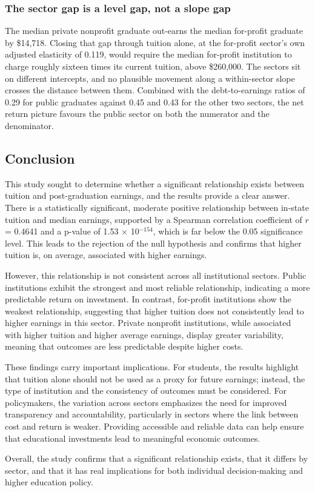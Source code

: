 \subsubsection*{The sector gap is a level gap, not a slope gap}

The median private nonprofit graduate out-earns the median for-profit graduate by \$14,718. Closing that gap through tuition alone, at the for-profit sector's own adjusted elasticity of 0.119, would require the median for-profit institution to charge roughly sixteen times its current tuition, above \$260,000. The sectors sit on different intercepts, and no plausible movement along a within-sector slope crosses the distance between them. Combined with the debt-to-earnings ratios of 0.29 for public graduates against 0.45 and 0.43 for the other two sectors, the net return picture favours the public sector on both the numerator and the denominator.

\subsection{Conclusion}

This study sought to determine whether a significant relationship exists between tuition and post-graduation earnings, and the results provide a clear answer. There is a statistically significant, moderate positive relationship between in-state tuition and median earnings, supported by a Spearman correlation coefficient of $r$ = 0.4641 and a p-value of 1.53 $\times$ 10$^{-154}$, which is far below the 0.05 significance level. This leads to the rejection of the null hypothesis and confirms that higher tuition is, on average, associated with higher earnings.

However, this relationship is not consistent across all institutional sectors. Public institutions exhibit the strongest and most reliable relationship, indicating a more predictable return on investment. In contrast, for-profit institutions show the weakest relationship, suggesting that higher tuition does not consistently lead to higher earnings in this sector. Private nonprofit institutions, while associated with higher tuition and higher average earnings, display greater variability, meaning that outcomes are less predictable despite higher costs.

These findings carry important implications. For students, the results highlight that tuition alone should not be used as a proxy for future earnings; instead, the type of institution and the consistency of outcomes must be considered. For policymakers, the variation across sectors emphasizes the need for improved transparency and accountability, particularly in sectors where the link between cost and return is weaker. Providing accessible and reliable data can help ensure that educational investments lead to meaningful economic outcomes.

Overall, the study confirms that a significant relationship exists, that it differs by sector, and that it has real implications for both individual decision-making and higher education policy.
